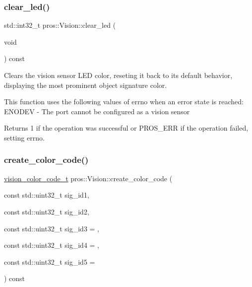 \subsubsection{\texorpdfstring{clear\+\_\+led()}{clear\_led()}}
{\footnotesize\ttfamily std\+::int32\+\_\+t pros\+::\+Vision\+::clear\+\_\+led (\begin{DoxyParamCaption}\item[{void}]{ }\end{DoxyParamCaption}) const}



Clears the vision sensor L\+ED color, reseting it back to its default behavior, displaying the most prominent object signature color. 

This function uses the following values of errno when an error state is reached\+: E\+N\+O\+D\+EV -\/ The port cannot be configured as a vision sensor

\begin{DoxyReturn}{Returns}
1 if the operation was successful or P\+R\+O\+S\+\_\+\+E\+RR if the operation failed, setting errno. 
\end{DoxyReturn}
\mbox{\label{classpros_1_1Vision_ab50bcfb700b591e2f1654962baac400f}} 
\subsubsection{\texorpdfstring{create\+\_\+color\+\_\+code()}{create\_color\_code()}}
{\footnotesize\ttfamily \hyperlink{vision_8h_a71f2011a47e95558bb534b05c16c7f2b}{vision\+\_\+color\+\_\+code\+\_\+t} pros\+::\+Vision\+::create\+\_\+color\+\_\+code (\begin{DoxyParamCaption}\item[{const std\+::uint32\+\_\+t}]{sig\+\_\+id1,  }\item[{const std\+::uint32\+\_\+t}]{sig\+\_\+id2,  }\item[{const std\+::uint32\+\_\+t}]{sig\+\_\+id3 = {},  }\item[{const std\+::uint32\+\_\+t}]{sig\+\_\+id4 = {},  }\item[{const std\+::uint32\+\_\+t}]{sig\+\_\+id5 = {} }\end{DoxyParamCaption}) const}



